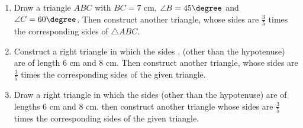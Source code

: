 \begin{enumerate}
\item Draw a triangle $ABC$ with $BC = 7 \text{ cm}$, $\angle B = 45 \degree$ and $\angle C = 60 \degree$. Then construct another triangle, whose sides are $\frac{3}{5}$ times the corresponding sides of $\triangle ABC$.\\
\item Construct a right triangle in which the sides , (other than the hypotenuse) are of length $6\text{ cm}$ and $8\text{ cm}$. Then construct another triangle, whose sides are $\frac{3}{5}$ times the corresponding sides of the given triangle.\\
\item Draw a right triangle in which the sides (other than the hypotenuse) are of lengths $6\text{ cm}$ and $8\text{ cm}$. then construct another triangle whose sides are $\frac{3}{5}$ times the corresponding sides of the given triangle.\\
\end{enumerate}
